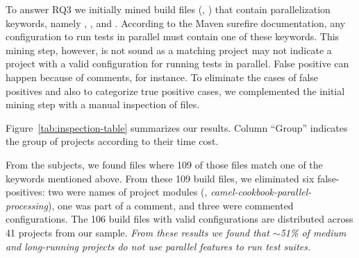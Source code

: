 
To answer RQ3 we initially mined build files (\ie,
\pomf{}) that contain parallelization keywords, namely
, , and .
According to the Maven surefire documentation,
any configuration to run tests in parallel must contain one of these
keywords. This mining step, however, is not sound as a matching
project may not indicate a project with a valid configuration for
running tests in parallel.  False positive can happen because of
comments, for instance.  To eliminate the cases of false positives and
also to categorize true positive cases, we complemented the initial
mining step with a manual inspection of files.


Figure~\ref{tab:inspection-table} summarizes our results.  Column
``Group'' indicates the group of projects according to their time
cost.

From the \numMedLong{} subjects, we found \pomMedLong{} \pomf{} files
where 109 of those files match one of the keywords
mentioned above.  From these 109 build files, we
eliminated six false-positives: two were names of project modules
(\eg, \emph{camel-cookbook-parallel-processing}), one was part of a
comment, and three were commented configurations. The 106 build files with valid configurations are distributed across
41 projects from our sample.  \emph{From these results
  we found that $\sim$51\% of medium and long-running projects do not
  use parallel features to run test suites.}

